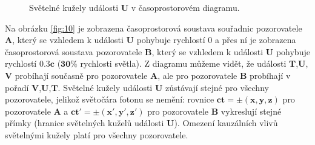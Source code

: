 \begin{enumerate}
\begin{figure}[ht]
        \caption{\label{fig:9}Světelné kužely události $\bm{U}$ v časoprostorovém diagramu.}
    \end{figure}

Na obrázku \ref{fig:10} je zobrazena časoprostorová soustava souřadnic pozorovatele $\bm{A}$, který se vzhledem k události $\bm{U}$ pohybuje rychlostí $0$ a přes ní je zobrazena časoprostorová soustava pozorovatele $\bm{B}$, který se vzhledem k události $\bm{U}$ pohybuje rychlostí $\bm{0.3c}$ ($\bm{30\%}$ rychlosti světla). Z diagramu můžeme vidět, že události $\bm{T}$,$\bm{U}$,$\bm{V}$ probíhají současně pro pozorovatele $\bm{A}$, ale pro pozorovatele $\bm{B}$ probíhají v pořadí $\bm{V}$,$\bm{U}$,$\bm{T}$. Světelné kužely události $\bm{U}$ zůstávají stejné pro všechny pozorovatele, jelikož světočára fotonu se nemění: rovnice $\bm{ct=\pm(x,y,z)}$ pro pozorovatele $\bm{A}$ a $\bm{ct'=\pm(x',y',z')}$ pro pozorovatele $\bm{B}$ vykreslují stejné přímky (hranice světelných kuželů události $\bm{U}$). Omezení kauzálních vlivů světelnými kužely platí pro všechny pozorovatele.

\begin{figure}[ht]

    \centering

\end{figure}
\end{enumerate}
